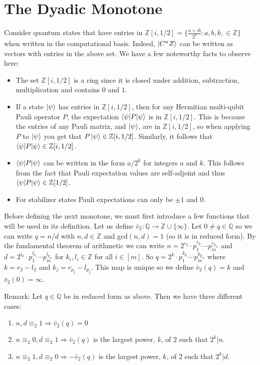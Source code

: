 \documentclass[12pt]{dalthesis}
\begin{document}
\section{The Dyadic Monotone}
Consider quantum states that have entries in $\mathbb{Z}[i, 1/2] = \big\{\frac{a+ib}{2^k}: a, b, k, \in \mathbb{Z} \big\}$ when written in the computational basis. Indeed, $\ket{C^nZ}$ can be written as vectors with entries in the above set. We have a few noteworthy facts to observe here:
\begin{itemize}
\item The set $\mathbb{Z}[i, 1/2]$ is a ring since it is closed under addition, subtraction, multiplication and contains $0$ and $1$.
\item If a state $\ket{\psi}$ has entries in $\mathbb{Z}[i, 1/2]$, then for any Hermitian multi-qubit Pauli operator $P$, the expectation $\braket{\psi | P | \psi}$ is in $\mathbb{Z}[i, 1/2]$. This is because the entries of any Pauli matrix, and $\ket{\psi}$, are in $\mathbb{Z}[i, 1/2]$, so when applying $P$ to $\ket{\psi}$ you get that $P\ket{\psi} \in \mathbb{Z}[i, 1/2]$. Similarly, it follows that $\braket{\psi | P | \psi} \in \mathbb{Z}[i, 1/2]$.
\item $\braket{\psi | P | \psi}$  can be written in the form $a/2^k$ for integers $a$ and $k$. This follows from the fact that Pauli expectation values are self-adjoint and thus $\braket{\psi | P | \psi} \in \mathbb{Z}[1/2]$.  
\item For stabilizer states Pauli expectations can only be $\pm 1$ and $0$.
\end{itemize}

Before defining the next monotone, we must first introduce a few functions that will be used in its definition. Let us define $\bar{v}_2 :\mathbb{Q} \rightarrow \mathbb{Z} \cup \{ \infty \}$. Let $0 \neq q \in \mathbb{Q}$ so we can write $q = n/d$ with $n, d \in \mathbb{Z}$ and gcd$(n, d) = 1$ (so it is in reduced form). By the fundamental theorem of arithmetic we can write $n = 2^{r_2} \cdot p^{r_{p_1}}_1 \cdots p^{r_{p_m}}_m$ and $d = 2^{l_2} \cdot p^{l_{p_1}}_1 \cdots p^{l_{p_m}}_m$ for $k_i, l_i \in \mathbb{Z}$ for all $i \in [m]$. So $q = 2^{k} \cdot p^{k_{p_1}}_1 \cdots p^{k_{p_m}}_m$ where $k = r_2 - l_2$ and $k_j = r_{p_j} - l_{p_j}$. This map is unique so we define $\bar{v}_2(q) = k$ and $\bar{v}_2(0) = \infty$.

Remark: Let $q \in \mathbb{Q}$ be in reduced form as above. Then we have three different cases:
\begin{enumerate}
\item $n, d \equiv_2 1 \Rightarrow \bar{v}_2(q)= 0$
\item $n \equiv_2 0, d \equiv_2 1 \Rightarrow \bar{v}_2(q)$ is the largest power, $k$, of $2$ such that $2^k|n$.
\item $n \equiv_2 1, d \equiv_2 0 \Rightarrow -\bar{v}_2(q)$ is the largest power, $k$, of $2$ such that $2^k|d$.
\end{enumerate}
\end{document}

